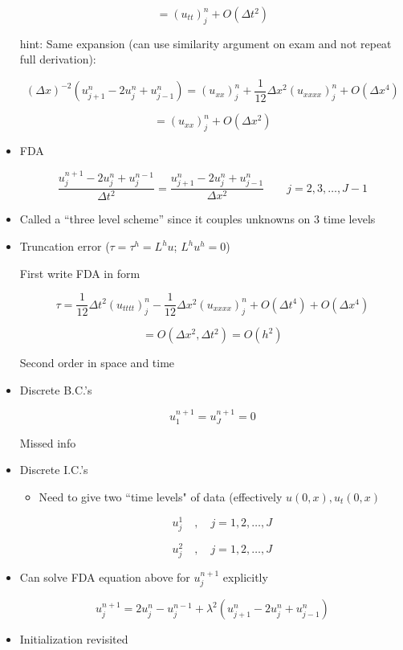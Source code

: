 \begin{itemize}
    \[ = (u_{tt})_j^n+O(\Delta t^2)\]


    hint: Same expansion (can use similarity argument on exam and not repeat full derivation): 

    
    \[ (\Delta x)^{-2} ( u_{j+1}^{n}-2u_j^n+u_{j-1}^{n}) = (u_{xx})_j^n + \frac{1}{12} \Delta x^2 (u_{xxxx})_j^n + O(\Delta x^4)\]

    \[ = (u_{xx})_j^n+O(\Delta x^2)\]


    \item FDA

    \[ \frac{u_j^{n+1}-2u_j^n+u_j^{n-1}}{\Delta t^2} = \frac{u_{j+1}^n - 2 u_j^n + u_{j-1}^n}{\Delta x^2} \qquad j=2,3,\ldots, J-1\]

    \item Called a ``three level scheme'' since it couples unknowns on 3 time levels 

    \item Truncation error ($\tau = \tau^h = L^h u $; $L^hu^h = 0$)

    First write FDA in form

    \[ \tau = \frac{1}{12} \Delta t^2 (u_{tttt})_j^n - \frac{1}{12}\Delta x^2 (u_{xxxx})_j^n + O(\Delta t^4) + O(\Delta x^4)\]

    \[ = O(\Delta x^2, \Delta t^2) = O(h^2)\]

    Second order in space and time

    \item Discrete B.C.'s 

    \[ u_1^{n+1} = u^{n+1}_J = 0\]

    Missed info 

    \item Discrete I.C.'s

    \begin{itemize}
        \item Need to give two ``time levels" of data (effectively $u(0,x), u_t(0,x)$

        \[ u_j^1 \quad , \quad j=1,2, \ldots , J\]

        \[ u_j^2 \quad , \quad j=1,2, \ldots , J\]
    \end{itemize}

    \item Can solve FDA equation above for $u_j^{n+1}$ explicitly

    \[ u_j^{n+1} = 2u_j^n -u_j^{n-1} + \lambda^2 ( u_{j+1}^n - 2u_j^n + u_{j-1}^n)\]

    \item Initialization revisited 


\end{itemize}
